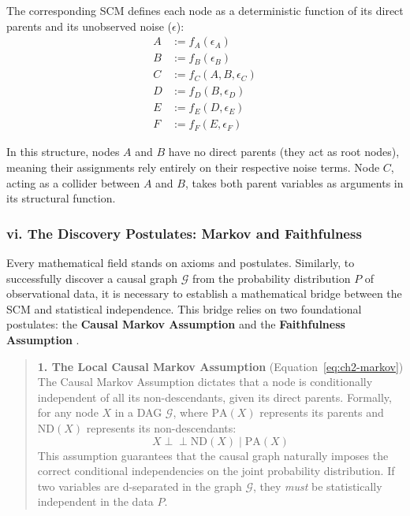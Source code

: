 The corresponding SCM defines each node as a deterministic function of its direct parents and its unobserved noise ($\epsilon$): 
\begin{align*}
A &:= f_A(\epsilon_A) \\
B &:= f_B(\epsilon_B) \\
C &:= f_C(A, B, \epsilon_C) \\
D &:= f_D(B, \epsilon_D) \\
E &:= f_E(D, \epsilon_E) \\
F &:= f_F(E, \epsilon_F)
\end{align*}

In this structure, nodes $A$ and $B$ have no direct parents (they act as root nodes), meaning their assignments rely entirely on their respective noise terms. Node $C$, acting as a collider between $A$ and $B$, takes both parent variables as arguments in its structural function.

\subsubsection*{vi. The Discovery Postulates: Markov and Faithfulness}

Every mathematical field stands on axioms and postulates. Similarly, to successfully discover a causal graph $\mathcal{G}$ from the probability distribution $P$ of observational data, it is necessary to establish a mathematical bridge between the SCM and statistical independence. This bridge relies on two foundational postulates: the \textbf{Causal Markov Assumption} and the \textbf{Faithfulness Assumption} \cite{neal2020}.

\begin{quote}
\textbf{1. The Local Causal Markov Assumption} (Equation~\eqref{eq:ch2-markov})\\
The Causal Markov Assumption dictates that a node is conditionally independent of all its non-descendants, given its direct parents. Formally, for any node $X$ in a DAG $\mathcal{G}$, where $\text{PA}(X)$ represents its parents and $\text{ND}(X)$ represents its non-descendants:
\begin{equation}
    \label{eq:ch2-markov}
    X \perp\!\!\!\perp \text{ND}(X) \mid \text{PA}(X)
\end{equation}
This assumption guarantees that the causal graph naturally imposes the correct conditional independencies on the joint probability distribution. If two variables are d-separated in the graph $\mathcal{G}$, they \textit{must} be statistically independent in the data $P$.
\end{quote}

